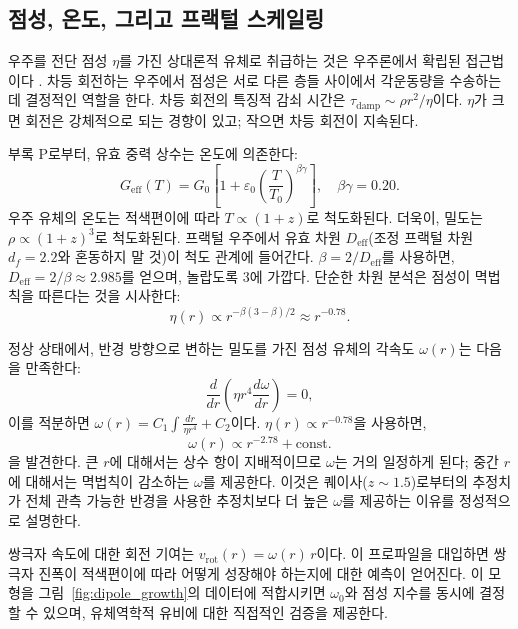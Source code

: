 \documentclass[11pt,a4paper]{article}
\begin{document}
	\subsection{점성, 온도, 그리고 프랙털 스케일링}
	
	우주를 전단 점성 \(\eta\)를 가진 상대론적 유체로 취급하는 것은 우주론에서 확립된 접근법이다 \cite{Giovannini2005}. 차등 회전하는 우주에서 점성은 서로 다른 층들 사이에서 각운동량을 수송하는 데 결정적인 역할을 한다. 차등 회전의 특징적 감쇠 시간은 \(\tau_{\mathrm{damp}} \sim \rho r^2 / \eta\)이다. \(\eta\)가 크면 회전은 강체적으로 되는 경향이 있고; 작으면 차등 회전이 지속된다.
	
	부록 P로부터, 유효 중력 상수는 온도에 의존한다:
	\begin{equation}
		G_{\mathrm{eff}}(T) = G_0\left[1 + \varepsilon_0\left(\frac{T}{T_0}\right)^{\beta\gamma}\right], \quad \beta\gamma = 0.20.
	\end{equation}
	우주 유체의 온도는 적색편이에 따라 \(T \propto (1+z)\)로 척도화된다. 더욱이, 밀도는 \(\rho \propto (1+z)^3\)로 척도화된다. 프랙털 우주에서 유효 차원 \(D_{\mathrm{eff}}\)(조정 프랙털 차원 \(d_f = 2.2\)와 혼동하지 말 것)이 척도 관계에 들어간다. \(\beta = 2/D_{\mathrm{eff}}\)를 사용하면, \(D_{\mathrm{eff}} = 2/\beta \approx 2.985\)를 얻으며, 놀랍도록 3에 가깝다. 단순한 차원 분석은 점성이 멱법칙을 따른다는 것을 시사한다:
	\begin{equation}
		\eta(r) \propto r^{-\beta(3-\beta)/2} \approx r^{-0.78}.
	\end{equation}
	
	정상 상태에서, 반경 방향으로 변하는 밀도를 가진 점성 유체의 각속도 \(\omega(r)\)는 다음을 만족한다:
	\begin{equation}
		\frac{d}{dr}\left( \eta r^4 \frac{d\omega}{dr} \right) = 0,
	\end{equation}
	이를 적분하면 \(\omega(r) = C_1 \int \frac{dr}{\eta r^4} + C_2\)이다. \(\eta(r) \propto r^{-0.78}\)을 사용하면,
	\begin{equation}
		\omega(r) \propto r^{-2.78} + \text{const}.
	\end{equation}
	을 발견한다. 큰 \(r\)에 대해서는 상수 항이 지배적이므로 \(\omega\)는 거의 일정하게 된다; 중간 \(r\)에 대해서는 멱법칙이 감소하는 \(\omega\)를 제공한다. 이것은 퀘이사(\(z\sim1.5\))로부터의 추정치가 전체 관측 가능한 반경을 사용한 추정치보다 더 높은 \(\omega\)를 제공하는 이유를 정성적으로 설명한다.
	
	쌍극자 속도에 대한 회전 기여는 \(v_{\mathrm{rot}}(r) = \omega(r) \, r\)이다. 이 프로파일을 대입하면 쌍극자 진폭이 적색편이에 따라 어떻게 성장해야 하는지에 대한 예측이 얻어진다. 이 모형을 그림~\ref{fig:dipole_growth}의 데이터에 적합시키면 \(\omega_0\)와 점성 지수를 동시에 결정할 수 있으며, 유체역학적 유비에 대한 직접적인 검증을 제공한다.
	
\end{document}

